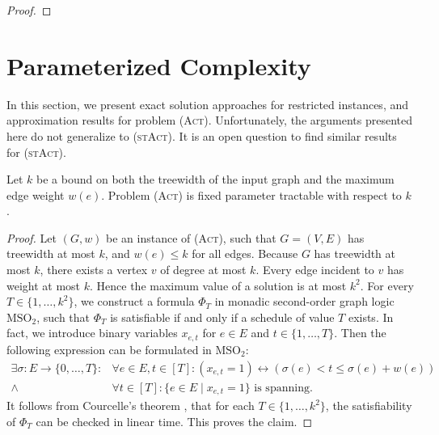 \documentclass[runningheads]{llncs}
\numberwithin{equation}{section}
\newcommand{\set}[1]{\{ #1 \}}
\newcommand{\fromto}[2]{\set{#1, \ldots, #2}}
\newcommand{\act}{\textsc{(Act)}}
\newcommand{\stact}{\textsc{(stAct)}}
\begin{document}
\begin{proof}
\end{proof}


\section{Parameterized Complexity}
\label{sec:positive_results}

In this section, we present exact solution approaches for restricted instances, and approximation results for problem {\act}. Unfortunately, the arguments presented here do not generalize to \stact. It is an open question to find similar results for \stact. 


\begin{theorem}
    Let $k$ be a bound on both the treewidth of the input graph and the maximum edge weight $w(e)$.
    Problem {\act} is fixed parameter tractable with respect to $k$.
\end{theorem}
\begin{proof}
Let $(G, w)$ be an instance of {\act}, such that $G = (V, E)$ has treewidth at most $k$, and $w(e) \leq k$ for all edges. Because $G$ has treewidth at most $k$, there exists a vertex $v$ of degree at most $k$. Every edge incident to $v$ has weight at most $k$. Hence the maximum value of a solution is at most $k^2$. For every $T \in \{1,\dots,k^2\}$, we construct a formula $\Phi_T$ in monadic second-order graph logic $\text{MSO}_2$, such that $\Phi_T$ is satisfiable if and only if a schedule of value $T$ exists. In fact, we introduce binary variables $x_{e,t}$ for $e \in E$ and $t \in \{1,\dots,T\}$. Then the following expression can be formulated in $\text{MSO}_2$:
\begin{align*}
\exists \sigma :  E \rightarrow \fromto{0}{T} : &\forall e \in E, t \in [T]: (x_{e,t}=1) \leftrightarrow \left(\sigma(e) < t \leq \sigma(e) + w(e)\right)\\
\land &\forall t \in [T]: \set{e \in E \mid x_{e,t} = 1} \text{ is spanning.}
\end{align*}
It follows from Courcelle's theorem \cite{courcelle1990monadic}, that for each $T \in \{1,\dots,k^2\}$, the satisfiability of $\Phi_T$ can be checked in linear time. This proves the claim.
\end{proof}
\end{document}
